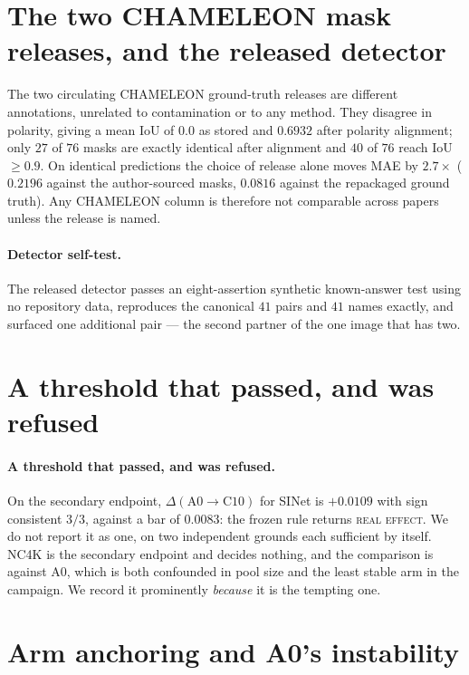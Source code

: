 \documentclass{article} %
\begin{document}
\section{The two CHAMELEON mask releases, and the released detector}
\label{app:masks}

The two circulating CHAMELEON ground-truth releases are different annotations, unrelated to
contamination or to any method. They disagree in polarity, giving a mean IoU of $0.0$ as stored and
$0.6932$ after polarity alignment; only $27$ of $76$ masks are exactly identical after alignment and
$40$ of $76$ reach IoU $\geq 0.9$. On identical predictions the choice of release alone moves MAE by
$2.7\times$ ($0.2196$ against the author-sourced masks, $0.0816$ against the repackaged ground truth).
Any CHAMELEON column is therefore not comparable across papers unless the release is named.

\paragraph{Detector self-test.} The released detector passes an eight-assertion synthetic
known-answer test using no repository data, reproduces the canonical $41$ pairs and $41$ names
exactly, and surfaced one additional pair --- the second partner of the one image that has two.


\section{A threshold that passed, and was refused}

\paragraph{A threshold that passed, and was refused.} On the secondary endpoint,
$\Delta(\mathrm{A0} \rightarrow \mathrm{C10})$ for SINet is $+0.0109$ with sign consistent $3/3$,
against a bar of $0.0083$: the frozen rule returns \textsc{real effect}. We do not report it as
one, on two independent grounds each sufficient by itself. NC4K is the secondary endpoint and decides
nothing, and the comparison is against A0, which is both confounded in pool size and the least
stable arm in the campaign. We record it prominently \emph{because} it is the tempting one.


\section{Arm anchoring and A0's instability}
\label{app:anchor}
\end{document}

